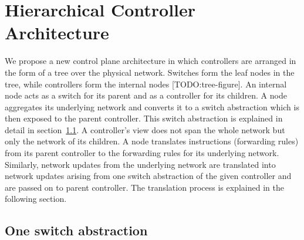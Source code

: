 \documentclass[10pt, twocolumn]{article}
\begin{document}
\section{Hierarchical Controller Architecture}
\label{sec:hierarchical}
We propose a new control plane architecture in which controllers are arranged in the form of a tree over the physical network. Switches form the leaf nodes in the tree, while controllers form the internal nodes [TODO:tree-figure]. An internal node acts as a switch for its parent and as a controller for its children. A node aggregates its underlying network and converts it to a switch abstraction which is then exposed to the parent controller. This switch abstraction is explained in detail in section~\ref{subsec:aggr}. A controller's view does not span the whole network but only the network of its children. A node translates instructions (forwarding rules) from its parent controller to the forwarding rules for its underlying network. Similarly, network updates from the underlying network are translated into network updates arising from one switch abstraction of the given controller and are passed on to parent controller. The translation process is explained in the following section.

\subsection{One switch abstraction}
\label{subsec:aggr}
\end{document}
